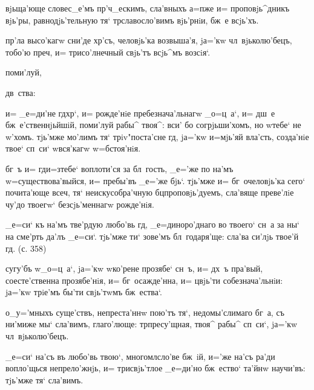  вjьща'юще словес_е'мъ 
пр'ч_ескимъ, сла'вныхъ а=п же и= проповjь^дникъ 
вjь'ры, равнодjь'тельную тя` тр славосло'вимъ 
вjь'рнiи, бж~е всjь'хъ.

   пр'ла высо'кагw сни'де 
хр'съ, человjь'ка возвыша'я, jа='кw чл~вjьколю'бецъ, 
тобо'ю преч, и= трисо'лнечный свjь'тъ всjь^мъ 
возсiя`.

 поми'луй, 

        дв~ства:

 и= _е=ди'не гд хр`, и= 
рожде'нiе пребезнача'льнагw _о=ц~а`, и= дш~е 
бж~е'ственнjьйшiй, поми'луй рабы^ твоя^: вси' бо 
согрjьши'хомъ, но w\т тебе` не w'хомъ. тjь'мже 
мо'лимъ тя` трiv"поста'сне гд, jа='кw и=мjь'яй 
вла'сть, созда'нiе твое` сп~си` w\т вся'кагw w=бстоя'нiя.

     
бг~ъ и= гд и=з\ъ тебе` воплоти'ся за бл~гость, _е='же 
по на'мъ w=существова'выйся, и= пребы'въ _е='же бjь`. 
тjь'мже и= бг~очеловjь'ка сего` почита'юще всеч, тя` 
неискусобра'чную бц проповjь'дуемъ, сла'вяще преве'лiе 
чу'до твоегw` безсjь'меннагw рожде'нiя.


  _е=си` къ на'мъ тве'рдую 
любо'вь гд, _е=диноро'днаго во твоего` сн~а за ны` на 
сме'рть да'лъ _е=си`. тjь'мже ти` зове'мъ бл~годаря'ще: 
сла'ва си'лjь твое'й гд. (с. 358)

 сугу'бъ w\т _о=ц~а`, jа='кw w\т ко'рене 
прозябе` сн~ъ, и= дх~ъ пра'вый, соесте'ственна 
прозябе'нiя, и= бг~осажде'нна, и= цвjь'ти 
собезнача'льнiи: jа='кw трiе'мъ бы'ти свjь'тwмъ 
бж~ества`. 

  о_у='мныхъ суще'ствъ, 
непреста'ннw пою'тъ тя`, недомы'слимаго бг~а, съ ни'миже 
мы` сла'вимъ, глаго'люще: тр пресу'щная, твоя^ рабы^ 
сп~си`, jа='кw чл~вjьколю'бецъ.

   _е=си` на'съ въ любо'вь 
твою`, многомл сло'ве бж~iй, и='же на'съ ра'ди 
вопло'щься непрело'жнjь, и= трисвjь'тлое _е=ди'но 
бж~ество` та'йнw научи'въ: тjь'мже тя` сла'вимъ.


